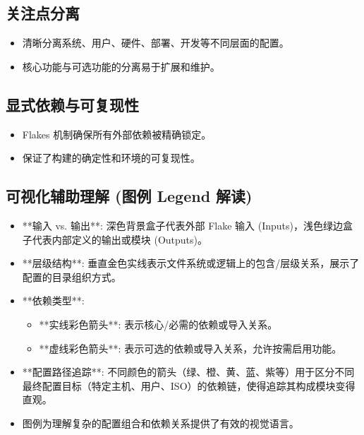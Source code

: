 \documentclass[11pt, a4paper]{article}
\begin{document}
    \subsection{关注点分离}
        \begin{itemize}
            \item 清晰分离系统、用户、硬件、部署、开发等不同层面的配置。
            \item 核心功能与可选功能的分离易于扩展和维护。
        \end{itemize}
    \subsection{显式依赖与可复现性}
        \begin{itemize}
            \item Flakes 机制确保所有外部依赖被精确锁定。
            \item 保证了构建的确定性和环境的可复现性。
        \end{itemize}
     \subsection{可视化辅助理解 (图例 Legend 解读)}
        \begin{itemize}
            \item **输入 vs. 输出**: 深色背景盒子代表外部 Flake 输入 (Inputs)，浅色绿边盒子代表内部定义的输出或模块 (Outputs)。
            \item **层级结构**: 垂直金色实线表示文件系统或逻辑上的包含/层级关系，展示了配置的目录组织方式。
            \item **依赖类型**:
                \begin{itemize}
                    \item **实线彩色箭头**: 表示核心/必需的依赖或导入关系。
                    \item **虚线彩色箭头**: 表示可选的依赖或导入关系，允许按需启用功能。
                \end{itemize}
            \item **配置路径追踪**: 不同颜色的箭头（绿、橙、黄、蓝、紫等）用于区分不同最终配置目标（特定主机、用户、ISO）的依赖链，使得追踪其构成模块变得直观。
            \item 图例为理解复杂的配置组合和依赖关系提供了有效的视觉语言。
        \end{itemize}
\end{document}

